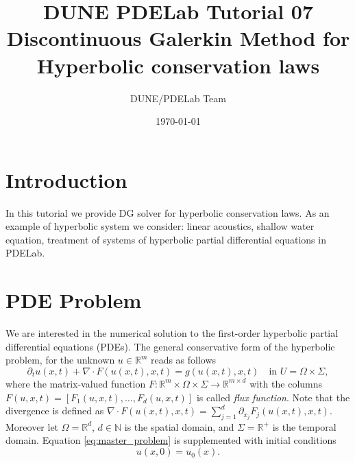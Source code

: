 \documentclass[a4paper,12pt]{article}
\title{DUNE PDELab Tutorial 07 \\
Discontinuous Galerkin Method for Hyperbolic conservation laws}
\author{DUNE/PDELab Team}
\date{\today}
\theoremstyle{definition}
\theoremstyle{definition}
\newcommand{\Dim}{d}
\begin{document}
\maketitle
\tableofcontents
\clearpage

\section{Introduction}

In this tutorial we provide  DG solver for hyperbolic conservation laws. As an example of hyperbolic system we consider: linear acoustics, shallow water equation, 
treatment of systems of hyperbolic partial differential equations in PDELab.

\section{PDE Problem}

We are interested in the numerical solution to the first-order
hyperbolic partial differential equations (PDEs). The general conservative form of the hyperbolic problem,  for  the unknown $u\in\mathbb{R}^m$
reads as follows
\begin{equation}
\label{eq:master_problem}
\partial_t u(x,t) + \nabla\cdot F(u(x,t),x,t) = g(u(x,t),x,t)  \quad\text{in $U=\Omega\times\Sigma$} ,
\end{equation}
where the matrix-valued function $F : \mathbb{R}^m\times\Omega\times\Sigma \to \mathbb{R}^{m\times \Dim}$
with the columns $F(u,x,t) = [F_1(u,x,t),\ldots,F_d(u,x,t)]$ is called \textit{flux function}.
Note that the divergence is defined as $\nabla\cdot F(u(x,t),x,t) = \sum_{j=1}^{\Dim} \partial_{x_j} F_j(u(x,t),x,t)$.
Moreover let $\Omega=\mathbb{R}^{\Dim}$, $\Dim\in\mathbb{N}$ is the spatial domain,  and $\Sigma=\mathbb{R}^+$ is the temporal domain. Equation \eqref{eq:master_problem} is supplemented with initial conditions
\begin{equation*}
u(x,0) = u_0(x) .
\end{equation*}
\end{document}
